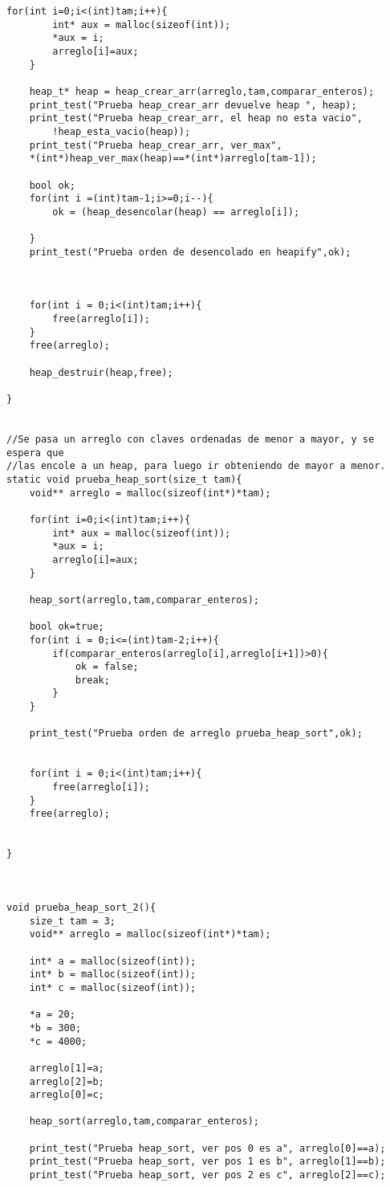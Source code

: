 \documentclass[11pt,a4paper]{article}
\begin{document}
\begin{lstlisting}[style= c]
	for(int i=0;i<(int)tam;i++){
		int* aux = malloc(sizeof(int));
		*aux = i;
		arreglo[i]=aux;
	} 	

	heap_t* heap = heap_crear_arr(arreglo,tam,comparar_enteros); 
	print_test("Prueba heap_crear_arr devuelve heap ", heap);
	print_test("Prueba heap_crear_arr, el heap no esta vacio",
		!heap_esta_vacio(heap));
	print_test("Prueba heap_crear_arr, ver_max",
    *(int*)heap_ver_max(heap)==*(int*)arreglo[tam-1]);

	bool ok;
	for(int i =(int)tam-1;i>=0;i--){
		ok = (heap_desencolar(heap) == arreglo[i]);
	
	}
	print_test("Prueba orden de desencolado en heapify",ok);

	

	for(int i = 0;i<(int)tam;i++){
		free(arreglo[i]);
	}
	free(arreglo);

	heap_destruir(heap,free);
	
}


//Se pasa un arreglo con claves ordenadas de menor a mayor, y se espera que 
//las encole a un heap, para luego ir obteniendo de mayor a menor.
static void prueba_heap_sort(size_t tam){
	void** arreglo = malloc(sizeof(int*)*tam);

	for(int i=0;i<(int)tam;i++){
		int* aux = malloc(sizeof(int));
		*aux = i;
		arreglo[i]=aux;
	} 	
	
	heap_sort(arreglo,tam,comparar_enteros);
	
	bool ok=true;
	for(int i = 0;i<=(int)tam-2;i++){
		if(comparar_enteros(arreglo[i],arreglo[i+1])>0){
			ok = false;
			break;
		}
	}

	print_test("Prueba orden de arreglo prueba_heap_sort",ok);
	

	for(int i = 0;i<(int)tam;i++){
		free(arreglo[i]);
	}
	free(arreglo);

	
}



void prueba_heap_sort_2(){
	size_t tam = 3;
	void** arreglo = malloc(sizeof(int*)*tam);

	int* a = malloc(sizeof(int));
	int* b = malloc(sizeof(int));
	int* c = malloc(sizeof(int));

	*a = 20;
	*b = 300;
	*c = 4000;

	arreglo[1]=a;
	arreglo[2]=b;
	arreglo[0]=c;

	heap_sort(arreglo,tam,comparar_enteros);

	print_test("Prueba heap_sort, ver pos 0 es a", arreglo[0]==a);
	print_test("Prueba heap_sort, ver pos 1 es b", arreglo[1]==b);
	print_test("Prueba heap_sort, ver pos 2 es c", arreglo[2]==c);


\end{lstlisting}
\end{document}
